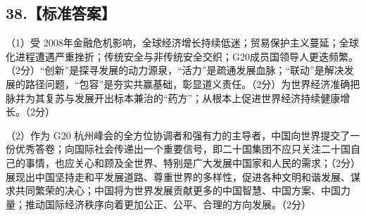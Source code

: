 \documentclass[UTF8,11pt]{ctexart}
\begin{document}
\subsection*{38.【标准答案】}

（1）受 2008年金融危机影响，全球经济增长持续低迷；贸易保护主义蔓延；全球化进程遭遇严重挫折；传统安全与非传统安全交织；G20成员国领导人更迭频繁。（2分）“创新”是探寻发展的动力源泉，“活力”是疏通发展血脉；“联动”是解决发展的路径问题，“包容”是夯实共赢基础，彰显道义责任。（2分）为世界经济准确把脉并为其复苏与发展开出标本兼治的“药方”；从根本上促进世界经济持续健康增长。（2分）


（2）作为 G20 杭州峰会的全方位协调者和强有力的主导者，中国向世界提交了一份优秀答卷；向国际社会传递出一个重要信号，即二十国集团不应只关注二十国自己的事情，也应关心和顾及全世界、特别是广大发展中国家和人民的需求；（2分）展现出中国坚持走和平发展道路、尊重世界的多样性，促进各种文明和谐发展、谋求共同繁荣的决心；中国将为世界发展贡献更多的中国智慧、中国方案、中国力量；推动国际经济秩序向着更加公正、公平、合理的方向发展。（2分）
\end{document}
